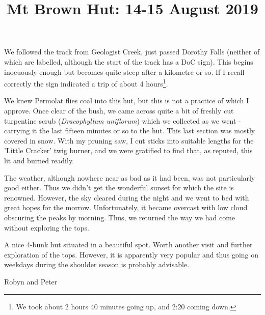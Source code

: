 \documentclass[12pt]{article} %
\title{Mt Brown Hut: 14-15 August 2019}
\makeatletter
\renewcommand{\maketitle}{%
  {\bfseries{\scshape{\Large{\@title\par}}}}
}
\makeatother
\begin{document}
  \maketitle

We followed the track from Geologist Creek, just passed Dorothy Falls (neither of which are labelled, although the start of the track has a DoC sign).  This begins inocuously enough but becomes quite steep after a kilometre or so.  If I recall correctly the sign indicated a trip of about 4 hours\footnote{We took about 2 hours 40 minutes going up, and 2:20 coming down.}.

We knew Permolat flies coal into this hut, but this is not a practice of which I approve.  Once clear of the bush, we came across quite a bit of freshly cut turpentine scrub (\textit{Dracophyllum uniflorum}) which we collected as we went - carrying it the last fifteen minutes or so to the hut.  This last section was mostly covered in snow.  With my pruning saw, I cut sticks into suitable lengths for the 'Little Cracker' twig burner, and we were gratified to find that, as reputed, this lit and burned readily.

The weather, although nowhere near as bad as it had been, was not particularly good either.  Thus we didn't get the wonderful sunset for which the site is renowned.  However, the sky cleared during the night and we went to bed with great hopes for the morrow.  Unfortunately, it became overcast with low cloud obscuring the peaks by morning.  Thus, we returned the way we had come without exploring the tops.

A nice 4-bunk hut situated in a beautiful spot.  Worth another visit and further exploration of the tops.  However, it is apparently very popular and thus going on weekdays during the shoulder season is probably advisable.


\begin{flushright}
Robyn and Peter
\end{flushright}
\end{document}

